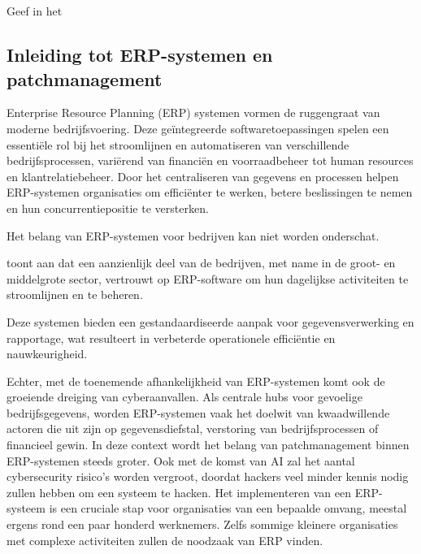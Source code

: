 \chapter{}%
\label{ch:stand-van-zaken}


 Geef in het






\section{Inleiding tot ERP-systemen en patchmanagement}
Enterprise Resource Planning (ERP) systemen vormen de ruggengraat van moderne bedrijfsvoering.
 Deze geïntegreerde softwaretoepassingen spelen een essentiële rol bij het stroomlijnen en automatiseren van verschillende bedrijfsprocessen, variërend van financiën en voorraadbeheer tot human resources en klantrelatiebeheer.
 Door het centraliseren van gegevens en processen helpen ERP-systemen organisaties om efficiënter te werken, betere beslissingen te nemen en hun concurrentiepositie te versterken.


Het belang van ERP-systemen voor bedrijven kan niet worden onderschat.

 \textcite{StatistiekVlaanderen2022} toont aan dat een aanzienlijk deel van de bedrijven, met name in de groot- en middelgrote sector, vertrouwt op ERP-software om hun dagelijkse activiteiten te stroomlijnen en te beheren.

 Deze systemen bieden een gestandaardiseerde aanpak voor gegevensverwerking en rapportage, wat resulteert in verbeterde operationele efficiëntie en nauwkeurigheid.

Echter, met de toenemende afhankelijkheid van ERP-systemen komt ook de groeiende dreiging van cyberaanvallen.
 Als centrale hubs voor gevoelige bedrijfsgegevens, worden ERP-systemen vaak het doelwit van kwaadwillende actoren die uit zijn op gegevensdiefstal, verstoring van bedrijfsprocessen of financieel gewin.
 In deze context wordt het belang van patchmanagement binnen ERP-systemen steeds groter.
 Ook met de komst van AI zal het aantal cybersecurity risico’s worden vergroot, doordat hackers veel minder kennis nodig zullen hebben om een systeem te hacken.
  \autocite{Pearson2024}
Het implementeren van een ERP-systeem is een cruciale stap voor organisaties van een bepaalde omvang, meestal ergens rond een paar honderd werknemers.
 Zelfs sommige kleinere organisaties met complexe activiteiten zullen de noodzaak van ERP vinden.

